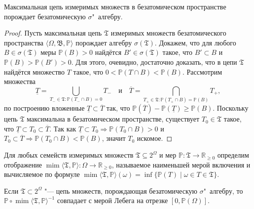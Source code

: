 \begin{lemma} \label{lemma:max}
	Максимальная цепь измеримых множеств в безатомическом пространстве порождает безатомическую $\sigma$"~алгебру.
\end{lemma}

\begin{proof}
	Пусть максимальная цепь $\mathfrak{T}$ измеримых множеств безатомического пространства $\langle \Omega, \mathfrak{B}, \mathbb{P} \rangle$ порождает алгебру $\sigma(\mathfrak{T})$. Докажем, что для любого $B \in \sigma(\mathfrak{T})$ меры $\mathbb{P}(B) > 0$ найдётся $B' \in \sigma(\mathfrak{T})$ такое, что $B' \subset B$ и $\mathbb{P}(B) > \mathbb{P}(B') > 0$. Для этого, очевидно, достаточно доказать, что в цепи $\mathfrak{T}$ найдётся множество $T$ такое, что $0 < \mathbb{P}(T \cap B) < \mathbb{P}(B)$. Рассмотрим множества
	\begin{equation*}
		\underline{T} = \bigcup_{T_- \in \mathfrak{T} : \mathbb{P}(T_- \cap B) = 0} T_- \quad\text{и}\quad \overline{T} = \bigcap_{T_+ \in \mathfrak{T} : \mathbb{P}(T_+ \cap B) = \mathbb{P}(B)} T_+,
	\end{equation*}
	по построению вложенные $\underline{T} \subset \overline{T}$ так, что $\mathbb{P}(\overline{T}) - \mathbb{P}(\underline{T}) \ge \mathbb{P}(B)$. Поскольку цепь $\mathfrak{T}$ максимальна в безатомическом пространстве, существует $T_0 \in \mathfrak{T}$ такое, что $\underline{T} \subset T_0 \subset \overline{T}$. Так как $\underline{T} \subset T_0 \Rightarrow \mathbb{P}(T_0 \cap B) > 0$ и $T_0 \subset \overline{T} \Rightarrow \mathbb{P}(T_0 \cap B) < \mathbb{P}(B)$, значит $T_0$ искомое.
\end{proof}

\begin{definition}
	Для любых семейств измеримых множеств $\mathfrak{T} \subseteq 2^\Omega$ и мер $\mathbb{P} : \mathfrak{T} \rightarrow \mathbb{R}_{\ge 0}$ определим отображение $\operatorname{mim}\langle\mathfrak{T}, \mathbb{P}\rangle : \Omega \rightarrow \mathbb{R}_{\ge 0}$, называемое наименьшей мерой включения и вычисляемое по формуле $\operatorname{mim}\langle\mathfrak{T}, \mathbb{P}\rangle(\omega) = \inf\{\mathbb{P}(T) \mid \omega \in T \in \mathfrak{T}\}$.
\end{definition}

\begin{lemma}
	Если $\mathfrak{T} \subset 2^\Omega$ "--- цепь множеств, порождающая безатомическую $\sigma$"~алгебру, то $\mathbb{P} \circ \operatorname{mim}\langle\mathfrak{T}, \mathbb{P}\rangle^{-1}$ совпадает с мерой Лебега на отрезке $[0, \mathbb{P}(\Omega)]$.
\end{lemma}


